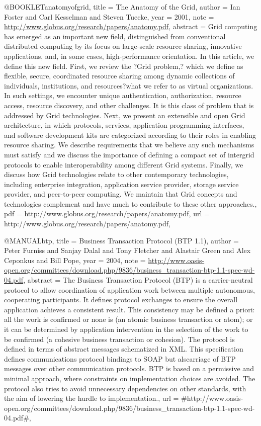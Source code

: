 @BOOKLET{anatomyofgrid,
  title = {{The Anatomy of the Grid}},
  author = {Ian Foster and Carl Kesselman and Steven Tuecke},
  year = {2001},
  note = {\url{http://www.globus.org/research/papers/anatomy.pdf}},
  abstract = {Grid computing has emerged as an important new
field, distinguished
	from conventional distributed computing by its
focus on large-scale
	resource sharing, innovative applications, and,
in some cases, high-performance
	orientation. In this article, we
define this new field. First, we
	review the ?Grid problem,? which we
define as flexible, secure, coordinated
	resource sharing among dynamic
collections of individuals, institutions,
	and resources?what we refer
to as virtual organizations. In such
	settings, we encounter unique
authentication, authorization, resource
	access, resource discovery,
and other challenges. It is this class
	of problem that is addressed
by Grid technologies. Next, we present
	an extensible and open Grid
architecture, in which protocols, services,
	application programming
interfaces, and software development kits
	are categorized according to
their roles in enabling resource sharing.
	We describe requirements
that we believe any such mechanisms must
	satisfy and we discuss the
importance of defining a compact set of
	intergrid protocols to enable
interoperability among different Grid
	systems. Finally, we discuss how Grid
technologies relate to other
	contemporary technologies, including enterprise
integration, application
	service provider, storage service provider, and
peer-to-peer computing.
	We maintain that Grid concepts and technologies
complement and have
	much to contribute to these other approaches.},
  pdf = {http://www.globus.org/research/papers/anatomy.pdf},
  url = {http://www.globus.org/research/papers/anatomy.pdf},
}

@MANUAL{btp,
  title = {{Business Transaction Protocol (BTP 1.1)}},
  author = {Peter Furniss and Sanjay Dalal and Tony Fletcher and Alastair Green
	and Alex Ceponkus and Bill Pope},
  year = {2004},
  note = {\url{http://www.oasis-open.org/committees/download.php/9836/business_transaction-btp-1.1-spec-wd-04.pdf}},
  abstract = {The Business Transaction Protocol (BTP) is a carrier-neutral protocol
	to allow
coordination of application work between multiple autonomous,
	cooperating
participants. It defines protocol exchanges to ensure
	the overall
application achieves a consistent result. This consistency
	may be defined a
priori: all the work is confirmed or none is (an
	atomic business
transaction or atom); or it can be determined by
	application intervention
in the selection of the work to be confirmed
	(a cohesive business
transaction or cohesion). The protocol is defined
	in terms of abstract
messages schematized in XML. This specification
	defines communications
protocol bindings to SOAP but alscarriage
	of BTP messages over other
communication protocols. BTP is based
	on a permissive and minimal
approach, where constraints on implementation
	choices are avoided.
The protocol also tries to avoid unnecessary
	dependencies on other
standards, with the aim of lowering the hurdle
	to implementation.},
  url = {#http://www.oasis-open.org/committees/download.php/9836/business_transaction-btp-1.1-spec-wd-04.pdf#},
}

